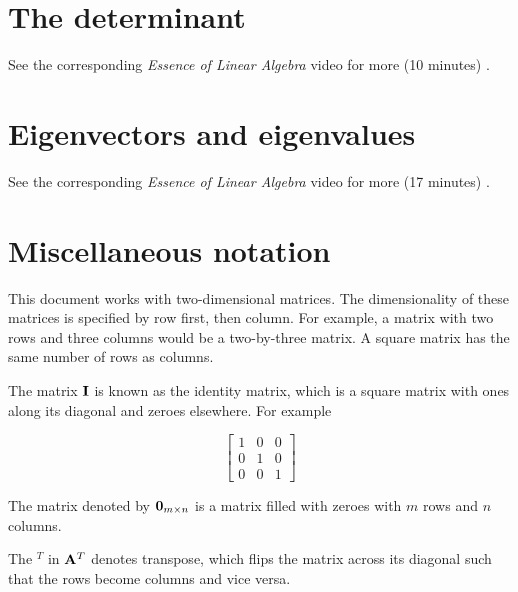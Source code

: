 \section{The determinant}

See the corresponding \textit{Essence of Linear Algebra} video for more (10
minutes) \cite{bib:linalg_the_determinant}.

\section{Eigenvectors and eigenvalues}

See the corresponding \textit{Essence of Linear Algebra} video for more (17
minutes) \cite{bib:linalg_eigenvectors_and_eigenvalues}.

\section{Miscellaneous notation}

This document works with two-dimensional matrices. The dimensionality of these
matrices is specified by row first, then column. For example, a matrix with two
rows and three columns would be a two-by-three matrix. A square matrix has the
same number of rows as columns.

The matrix $\mathbf{I}$ is known as the identity matrix, which is a square matrix
with ones along its diagonal and zeroes elsewhere. For example

\begin{equation*}
  \left[
  \begin{array}{ccc}
    1 & 0 & 0 \\
    0 & 1 & 0 \\
    0 & 0 & 1
  \end{array}
  \right]
\end{equation*}

The matrix denoted by $\mathbf{0}_{m \times n}$ is a matrix filled with zeroes with
$m$ rows and $n$ columns.

The $^T$ in $\mathbf{A}^T$ denotes transpose, which flips the matrix across its
diagonal such that the rows become columns and vice versa.
